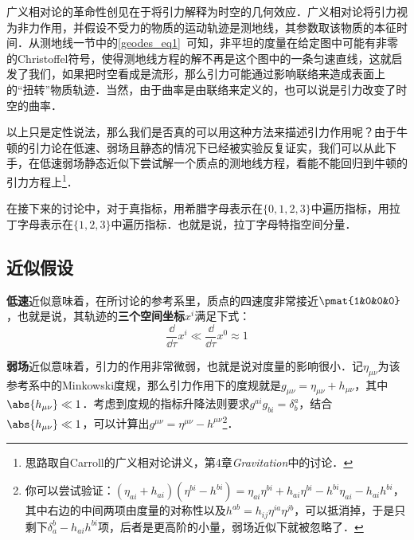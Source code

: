 

广义相对论的革命性创见在于将引力解释为时空的几何效应．广义相对论将引力视为非力作用，并假设不受力的物质的运动轨迹是测地线，其参数取该物质的本征时间．从测地线一节中的\autoref{geodes_eq1}~可知，非平坦的度量在给定图中可能有非零的Christoffel符号，使得测地线方程的解不再是这个图中的一条匀速直线，这就启发了我们，如果把时空看成是流形，那么引力可能通过影响联络来造成表面上的“扭转”物质轨迹．当然，由于曲率是由联络来定义的，也可以说是引力改变了时空的曲率．

以上只是定性说法，那么我们是否真的可以用这种方法来描述引力作用呢？由于牛顿的引力论在低速、弱场且静态的情况下已经被实验反复证实，我们可以从此下手，在低速弱场静态近似下尝试解一个质点的测地线方程，看能不能回归到牛顿的引力方程上\footnote{思路取自Carroll的广义相对论讲义\cite{CarrollGR}，第4章\textsl{Gravitation}中的讨论．}．

在接下来的讨论中，对于真指标，用希腊字母表示在$\{0, 1, 2, 3\}$中遍历指标，用拉丁字母表示在$\{1, 2, 3\}$中遍历指标．也就是说，拉丁字母特指空间分量．

\subsection{近似假设}

\textbf{低速}近似意味着，在所讨论的参考系里，质点的四速度非常接近$\pmat{1&0&0&0}$，也就是说，其轨迹的\textbf{三个空间坐标}$x^i$满足下式：
\begin{equation}\label{WeakG_eq1}
\frac{\dd}{\dd \tau}x^i\ll \frac{\dd}{\dd \tau}x^0\approx 1
\end{equation}

\textbf{弱场}近似意味着，引力的作用非常微弱，也就是说对度量的影响很小．记$\eta_{\mu\nu}$为该参考系中的Minkowski度规，那么引力作用下的度规就是$g_{\mu\nu}=\eta_{\mu\nu}+h_{\mu\nu}$，其中$\abs{h_{\mu\nu}}\ll 1$．考虑到度规的指标升降法则要求$g^{ai}g_{bi}=\delta^a_b$，结合$\abs{h_{\mu\nu}}\ll 1$，可以计算出$g^{\mu\nu}=\eta^{\mu\nu}-h^{\mu\nu}$\footnote{你可以尝试验证：$(\eta_{ai}+h_{ai})(\eta^{bi}-h^{bi})=\eta_{ai}\eta^{bi}+h_{ai}\eta^{bi}-h^{bi}\eta_{ai}-h_{ai}h^{bi}$，其中右边的中间两项由度量的对称性以及$h^{ab}=h_{ij}\eta^{ia}\eta^{jb}$，可以抵消掉，于是只剩下$\delta^b_a-h_{ai}h^{bi}$项，后者是更高阶的小量，弱场近似下就被忽略了．}．

